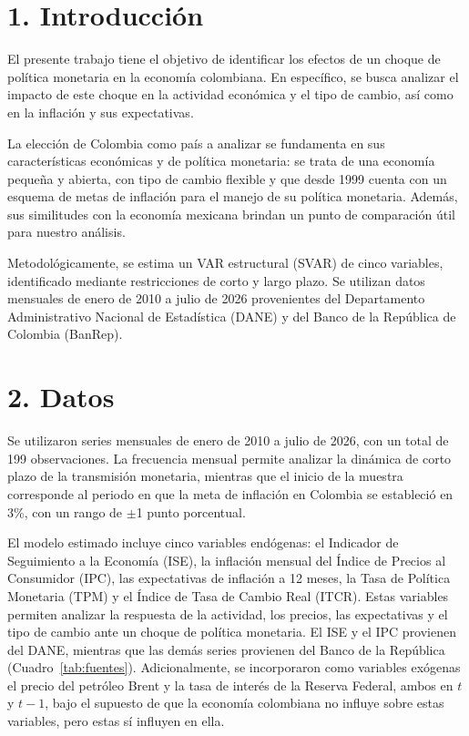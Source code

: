 \documentclass[12pt,letterpaper]{article}
\begin{document}
\section*{1. Introducci\'on}

El presente trabajo tiene el objetivo de identificar los efectos de un choque de política monetaria en la economía colombiana. En específico, se busca analizar el impacto de este choque en la actividad económica y el tipo de cambio, así como en la inflación y sus expectativas.

La elección de Colombia como país a analizar se fundamenta en sus características económicas y de política monetaria: se trata de una economía pequeña y abierta, con tipo de cambio flexible y que desde 1999 cuenta con un esquema de metas de inflación para el manejo de su política monetaria. Además, sus similitudes con la economía mexicana brindan un punto de comparación útil para nuestro análisis.

Metodológicamente, se estima un VAR estructural (SVAR) de cinco variables, identificado mediante restricciones de corto y largo plazo. Se utilizan datos mensuales de enero de 2010 a julio de 2026 provenientes del Departamento Administrativo Nacional de Estadística (DANE) y del Banco de la República de Colombia (BanRep).

\section*{2. Datos}

Se utilizaron series mensuales de enero de 2010 a julio de 2026, con un total de 199 observaciones. La frecuencia mensual permite analizar la dinámica de corto plazo de la transmisión monetaria, mientras que el inicio de la muestra corresponde al periodo en que la meta de inflación en Colombia se estableció en 3\%, con un rango de $\pm$1 punto porcentual.

El modelo estimado incluye cinco variables endógenas: el Indicador de Seguimiento a la Economía (ISE), la inflación mensual del Índice de Precios al Consumidor (IPC), las expectativas de inflación a 12 meses, la Tasa de Política Monetaria (TPM) y el Índice de Tasa de Cambio Real (ITCR). Estas variables permiten analizar la respuesta de la actividad, los precios, las expectativas y el tipo de cambio ante un choque de política monetaria. El ISE y el IPC provienen del DANE, mientras que las demás series provienen del Banco de la República (Cuadro~\ref{tab:fuentes}). Adicionalmente, se incorporaron como variables exógenas el precio del petróleo Brent y la tasa de interés de la Reserva Federal, ambos en $t$ y $t-1$, bajo el supuesto de que la economía colombiana no influye sobre estas variables, pero estas sí influyen en ella.
\end{document}
